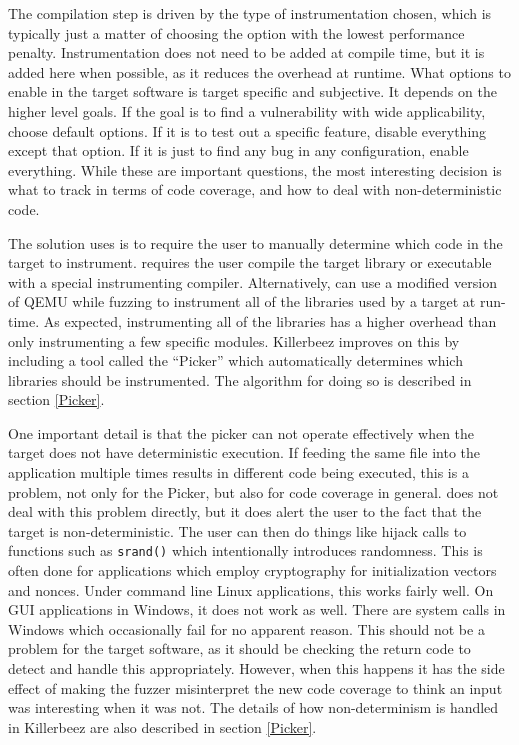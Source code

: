 The compilation step is driven by the type of instrumentation chosen,
which is typically just a matter of choosing the option with the lowest
performance penalty. Instrumentation does not need to be added at compile
time, but it is added here when possible, as it reduces the overhead at runtime.
What options to enable in the target software is target specific and
subjective.  It depends on the higher level goals.  If the goal is to find a
vulnerability with wide applicability, choose default options. If it is to test
out a specific feature, disable everything except that option. If it is just to
find any bug in any configuration, enable everything.  While these are
important questions, the most interesting decision is what to track in terms of
code coverage, and how to deal with non-deterministic code.

The solution \AFL{} uses is to require the user to manually determine which code
in the target to instrument. \AFL{} requires the user compile the target library
or executable with a special instrumenting compiler. Alternatively, \AFL{} can
use a modified version of QEMU while fuzzing to instrument all of the libraries
used by a target at run-time.  As expected, instrumenting all of the libraries
has a higher overhead than only instrumenting a few specific modules. Killerbeez
improves on this by including a tool
called the ``Picker'' which automatically determines which libraries should be
instrumented.  The algorithm for doing so is described in section \ref{Picker}.

One important detail is that the picker can not operate effectively when the
target does not have deterministic execution.  If feeding the same file into
the application multiple times results in different code being executed, this
is a problem, not only for the Picker, but also for code coverage in general.
\AFL{} does not deal with this problem directly, but it does alert the user to
the fact that the target is non-deterministic. The user can then do things like
hijack calls to functions such as \texttt{srand()} which intentionally introduces
randomness. This is often done for applications which employ cryptography for
initialization vectors and nonces. Under command line Linux applications, this
works fairly well.  On GUI applications in Windows, it does not work as well.
There are system calls in Windows which occasionally fail for no apparent reason. This
should not be a problem for the target software, as it should be checking the return code to
detect and handle this appropriately.  However, when this happens it has the
side effect of making the fuzzer misinterpret the new code coverage to think an input was interesting when it was
not.  The details of how non-determinism is handled in Killerbeez are also described in
section \ref{Picker}.

